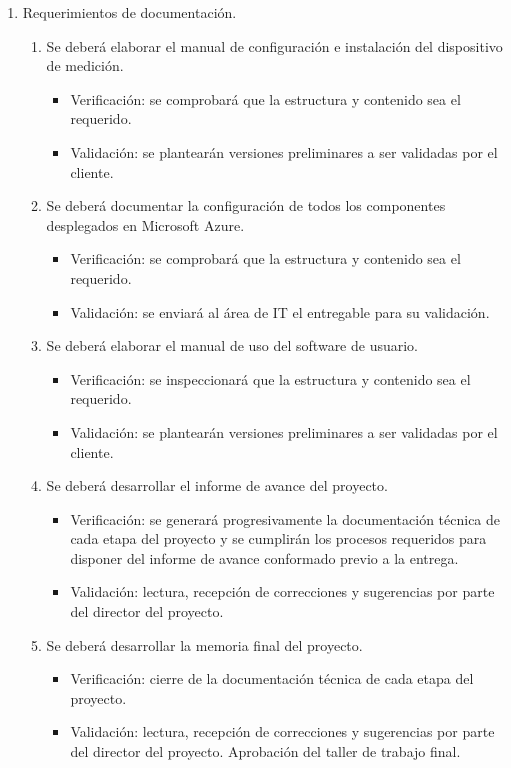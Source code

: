 \documentclass[
11pt, %
]{charter}
\begin{document}
\begin{enumerate}
	\item Requerimientos de documentación.
		\begin{enumerate}
			\item Se deberá elaborar el manual de configuración e instalación del dispositivo de medición.
			\begin{itemize}
				\item Verificación: se comprobará que la estructura y contenido sea el requerido. 
				\item Validación: se plantearán versiones preliminares a ser validadas por el cliente.
			\end{itemize}			
			\item Se deberá documentar la configuración de todos los componentes desplegados en Microsoft Azure.
			\begin{itemize}
				\item Verificación: se comprobará que la estructura y contenido sea el requerido. 
				\item Validación: se enviará al área de IT el entregable para su validación.
			\end{itemize}
			\item Se deberá elaborar el manual de uso del software de usuario.
			\begin{itemize}
				\item Verificación: se inspeccionará que la estructura y contenido sea el requerido.
				\item Validación: se plantearán versiones preliminares a ser validadas por el cliente.
			\end{itemize}
			\item Se deberá desarrollar el informe de avance del proyecto.
			\begin{itemize}
				\item Verificación: se generará progresivamente la documentación técnica de cada etapa del proyecto y se cumplirán los procesos requeridos para disponer del informe de avance conformado previo a la entrega.
				\item Validación: lectura, recepción de correcciones y sugerencias por parte del director del proyecto.
			\end{itemize}
			\item Se deberá desarrollar la memoria final del proyecto.
			\begin{itemize}
				\item Verificación: cierre de la documentación técnica de cada etapa del proyecto. 
				\item Validación: lectura, recepción de correcciones y sugerencias por parte del director del proyecto. Aprobación del taller de trabajo final.
			\end{itemize}
		\end{enumerate}
		
	\end{enumerate}
\end{document}
